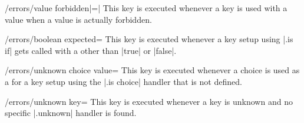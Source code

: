 \begin{docKey}{/errors/value forbidden}{|=|}{}
  This key is executed whenever a key is used with a value when a
  value is actually forbidden.
\end{docKey}

\begin{docKey}{/errors/boolean expected}{=}{}
  This key is executed whenever a key setup using |.is if| gets called
  with a  other than |true| or |false|.
\end{docKey}

\begin{docKey}{/errors/unknown choice value}{=}{}
  This key is executed whenever a choice is used as a  for
  a key setup using the |.is choice| handler that is not defined.
\end{docKey}

\begin{docKey}{/errors/unknown key}{=}{}
  This key is executed whenever a key is unknown and no specific
  |.unknown| handler is found.
\end{docKey}





